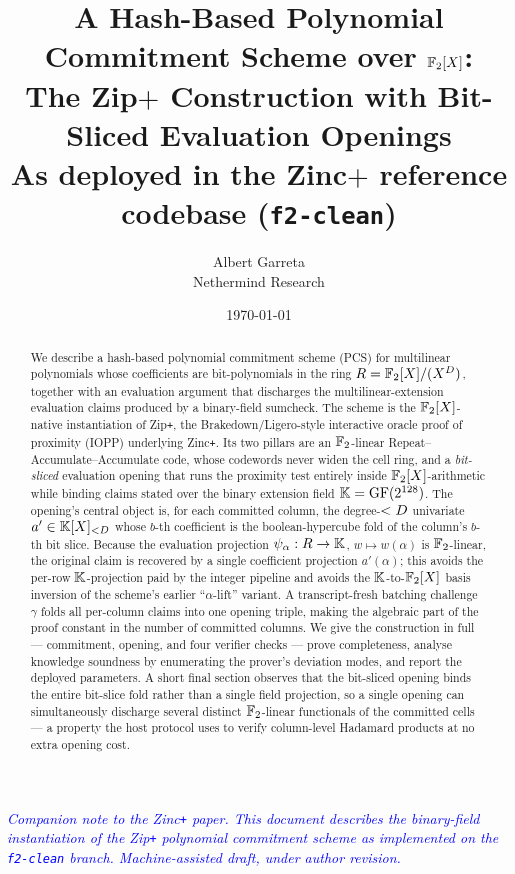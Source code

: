 \documentclass[11pt]{article}
\title{A Hash-Based Polynomial Commitment Scheme over $\mathbb{F}_2[X]$:\\
       The Zip\texorpdfstring{$+$}{+} Construction with Bit-Sliced
       Evaluation Openings\\[4pt]
       \large As deployed in the Zinc\texorpdfstring{$+$}{+} reference codebase
       (\texttt{f2-clean})}
\author{Albert Garreta \\[2pt] \normalsize Nethermind Research}
\date{\today}
\begin{document}
\maketitle

\begin{center}
\textcolor{blue}{\textit{Companion note to the Zinc\texttt{+} paper. This
document describes the binary-field instantiation of the Zip\texttt{+}
polynomial commitment scheme as implemented on the \texttt{f2-clean}
branch. Machine-assisted draft, under author revision.}}
\end{center}
\vspace{0.5em}

\begin{abstract}
We describe a hash-based polynomial commitment scheme (PCS) for
multilinear polynomials whose coefficients are bit-polynomials in the
ring $R = \mathbb{F}_2[X]/(X^{D})$, together with an evaluation
argument that discharges the multilinear-extension evaluation claims
produced by a binary-field sumcheck. The scheme is the
$\mathbb{F}_2[X]$-native instantiation of Zip\texttt{+}, the Brakedown/Ligero-style
interactive oracle proof of proximity (IOPP) underlying Zinc\texttt{+}. Its
two pillars are an $\mathbb{F}_2$-linear Repeat--Accumulate--Accumulate code,
whose codewords never widen the cell ring, and a \emph{bit-sliced}
evaluation opening that runs the proximity test entirely inside
$\mathbb{F}_2[X]$-arithmetic while binding claims stated over the binary
extension field $\mathbb{K} = \mathrm{GF}(2^{128})$. The opening's central
object is, for each committed column, the degree-$<D$ univariate
$a' \in \mathbb{K}[X]_{<D}$ whose $b$-th coefficient is the boolean-hypercube fold
of the column's $b$-th bit slice. Because the evaluation projection
$\psi_{\alpha} : R \to \mathbb{K}$, $w \mapsto w(\alpha)$ is $\mathbb{F}_2$-linear, the
original claim is recovered by a single coefficient projection
$a'(\alpha)$; this avoids the per-row $\mathbb{K}$-projection paid by the
integer pipeline and avoids the $\mathbb{K}$-to-$\mathbb{F}_2[X]$ basis inversion of
the scheme's earlier ``$\alpha$-lift'' variant. A transcript-fresh
batching challenge $\gamma$ folds all per-column claims into one opening
triple, making the algebraic part of the proof constant in the number
of committed columns. We give the construction in full --- commitment,
opening, and four verifier checks --- prove completeness, analyse
knowledge soundness by enumerating the prover's deviation modes, and
report the deployed parameters. A short final section observes that the
bit-sliced opening binds the entire bit-slice fold rather than a single
field projection, so a single opening can simultaneously discharge
several distinct $\mathbb{F}_2$-linear functionals of the committed cells ---
a property the host protocol uses to verify column-level Hadamard
products at no extra opening cost.
\end{abstract}

\tableofcontents








\end{document}
